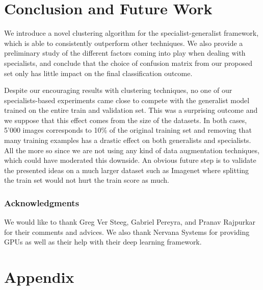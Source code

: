 \documentclass[12pt]{article}
\begin{document}
\section{Conclusion and Future Work}\label{conclusion-and-future-work}

We introduce a novel clustering algorithm for the specialist-generalist
framework, which is able to consistently outperform other techniques. We
also provide a preliminary study of the different factors coming into
play when dealing with specialists, and conclude that the choice of
confusion matrix from our proposed set only has little impact on the
final classification outcome.

Despite our encouraging results with clustering techniques, no one of
our specialists-based experiments came close to compete with the
generalist model trained on the entire train and validation set. This
was a surprising outcome and we suppose that this effect comes from the
size of the datasets. In both cases, 5'000 images corresponds to 10\% of
the original training set and removing that many training examples has a
drastic effect on both generalists and specialists. All the more so
since we are not using any kind of data augmentation techniques, which
could have moderated this downside. An obvious future step is to
validate the presented ideas on a much larger dataset such as
Imagenet \cite{imagenet} where splitting the train set would not hurt the train
score as much.

\subsubsection{Acknowledgments}

We would like to thank Greg Ver Steeg, Gabriel Pereyra, and Pranav Rajpurkar for their comments and advices. We also thank Nervana Systems
for providing GPUs as well as their help with their deep learning
framework.

\section{Appendix}\label{appendix}

\end{document}
